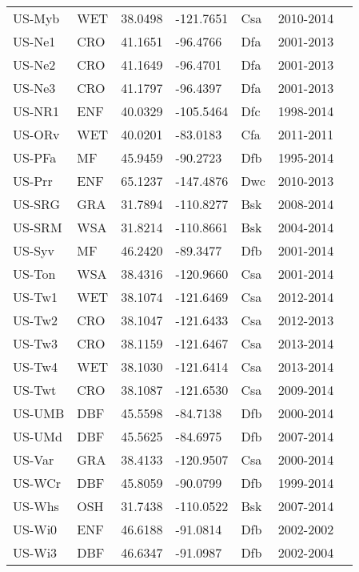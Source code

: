 \documentclass[a4paper, 12pt]{article}
\begin{document}
\begin{longtable}{l l l l l l l}
US-Myb & WET & 38.0498 & -121.7651 & Csa & 2010-2014 & \cite{US-Myb} \\
US-Ne1 & CRO & 41.1651 & -96.4766 & Dfa & 2001-2013 & \cite{US-Ne1} \\
US-Ne2 & CRO & 41.1649 & -96.4701 & Dfa & 2001-2013 & \cite{US-Ne2} \\
US-Ne3 & CRO & 41.1797 & -96.4397 & Dfa & 2001-2013 & \cite{US-Ne3} \\
US-NR1 & ENF & 40.0329 & -105.5464 & Dfc & 1998-2014 & \cite{US-NR1} \\
US-ORv & WET & 40.0201 & -83.0183 & Cfa & 2011-2011 & \cite{US-ORv} \\
US-PFa & MF & 45.9459 & -90.2723 & Dfb & 1995-2014 & \cite{US-PFa} \\
US-Prr & ENF & 65.1237 & -147.4876 & Dwc & 2010-2013 & \cite{US-Prr} \\
US-SRG & GRA & 31.7894 & -110.8277 & Bsk & 2008-2014 & \cite{US-SRG} \\
US-SRM & WSA & 31.8214 & -110.8661 & Bsk & 2004-2014 & \cite{US-SRM} \\
US-Syv & MF & 46.2420 & -89.3477 & Dfb & 2001-2014 & \cite{US-Syv} \\
US-Ton & WSA & 38.4316 & -120.9660 & Csa & 2001-2014 & \cite{US-Ton} \\
US-Tw1 & WET & 38.1074 & -121.6469 & Csa & 2012-2014 & \cite{US-Tw1} \\
US-Tw2 & CRO & 38.1047 & -121.6433 & Csa & 2012-2013 & \cite{US-Tw2} \\
US-Tw3 & CRO & 38.1159 & -121.6467 & Csa & 2013-2014 & \cite{US-Tw3} \\
US-Tw4 & WET & 38.1030 & -121.6414 & Csa & 2013-2014 & \cite{US-Tw4} \\
US-Twt & CRO & 38.1087 & -121.6530 & Csa & 2009-2014 & \cite{US-Twt} \\
US-UMB & DBF & 45.5598 & -84.7138 & Dfb & 2000-2014 & \cite{US-UMB} \\
US-UMd & DBF & 45.5625 & -84.6975 & Dfb & 2007-2014 & \cite{US-UMd} \\
US-Var & GRA & 38.4133 & -120.9507 & Csa & 2000-2014 & \cite{US-Var} \\
US-WCr & DBF & 45.8059 & -90.0799 & Dfb & 1999-2014 & \cite{US-WCr} \\
US-Whs & OSH & 31.7438 & -110.0522 & Bsk & 2007-2014 & \cite{US-Whs} \\
US-Wi0 & ENF & 46.6188 & -91.0814 & Dfb & 2002-2002 & \cite{US-Wi0} \\
US-Wi3 & DBF & 46.6347 & -91.0987 & Dfb & 2002-2004 & \cite{US-Wi3} \\

\end{longtable}
\end{document}
